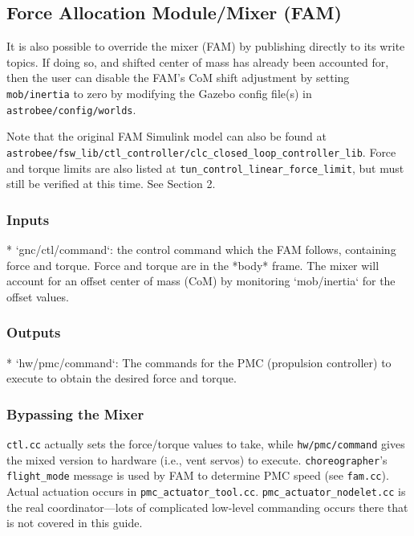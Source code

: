 \documentclass{article}
\begin{document}
\subsection{Force Allocation Module/Mixer (FAM)}

It is also possible to override the mixer (FAM) by publishing directly to its write topics. If doing so, and shifted center of mass has already been accounted for, then the user can disable the FAM's CoM shift adjustment by setting \texttt{mob/inertia}  to zero by modifying the Gazebo config file(s) in \texttt{astrobee/config/worlds}.

Note that the original FAM Simulink model can also be found at\\
\texttt{astrobee/fsw\_lib/ctl\_controller/clc\_closed\_loop\_controller\_lib}.
Force and torque limits are also listed at
\texttt{tun\_control\_linear\_force\_limit}, but must still be verified at this
time. See Section 2.

\subsubsection{Inputs}
\begin{markdown}
* `gnc/ctl/command`: the control command which the FAM follows, containing force and torque. Force and torque are in the *body* frame. The mixer will account for an offset center of mass (CoM) by monitoring `mob/inertia` for the offset values.
\end{markdown}

\subsubsection{Outputs}
\begin{markdown}
* `hw/pmc/command`: The commands for the PMC (propulsion controller) to execute to obtain the desired force and torque.
\end{markdown}

\subsubsection{Bypassing the Mixer}

\texttt{ctl.cc} actually sets the force/torque values to take, while \texttt{hw/pmc/command} gives the mixed version to hardware (i.e., vent servos) to execute. \texttt{choreographer}'s \texttt{flight\_mode} message is used by FAM to determine PMC speed (see \texttt{fam.cc}). Actual actuation occurs in \texttt{pmc\_actuator\_tool.cc}. \texttt{pmc\_actuator\_nodelet.cc} is the real coordinator---lots of complicated low-level commanding occurs there that is not covered in this guide.
\end{document}
